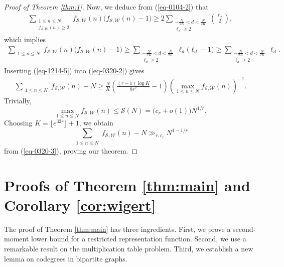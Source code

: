 \documentclass[12pt,a4paper,reqno]{amsart}
\numberwithin{equation}{section}
\theoremstyle{plain}
\theoremstyle{definition}
\begin{document}
\begin{proof}[Proof of Theorem \ref{thm:1}]
Now, we deduce from (\ref{eq-0104-2}) that
\begin{align*}
\sum_{\substack{1\leq n \leq N \\ f_{\mathscr{S}, \mathscr{W}}(n)\ge 2}}f_{\mathscr{S}, \mathscr{W}}(n)\big(f_{\mathscr{S}, \mathscr{W}}(n)-1\big)\ge 2\sum_{\substack{-\frac{N}{2K}<d<\frac{N}{2K}\\ \ell_d\ge 2}}\binom{\ell_d}{2},
\end{align*}
which implies
\begin{align}\label{eq-0320-2}
\sum_{\substack{1\leq n \leq N}}f_{\mathscr{S}, \mathscr{W}}(n)\big(f_{\mathscr{S}, \mathscr{W}}(n)-1\big)\ge \sum_{\substack{-\frac{N}{2K}<d<\frac{N}{2K}\\ \ell_d\ge 2}}\ell_d\big(\ell_d-1\big)\ge \sum_{\substack{-\frac{N}{2K}<d<\frac{N}{2K}\\ \ell_d\ge 2}}\ell_d.
\end{align}
Inserting (\ref{eq-1214-5}) into (\ref{eq-0320-2}) gives
\begin{align}\label{eq-0320-3}
\sum_{\substack{1\leq n \leq N}}f_{\mathscr{S}, \mathscr{W}}(n)-N\ge \frac{N}{K}\left(\frac{(r-1)\log K}{8r^2}-1\right) \left(\max_{1\le n\le N}f_{\mathscr{S}, \mathscr{W}}(n)\right)^{-1}.
\end{align}
Trivially, 
$$
\max_{1\le n\le N}f_{\mathscr{S}, \mathscr{W}}(n)\le \mathscr{S}(N)=\big(c_r+o(1)\big)N^{1/r}.
$$
Choosing $K=\lfloor e^{32r}\rfloor+1$, we obtain 
$$
\sum_{\substack{1\leq n \leq N}}f_{\mathscr{S}, \mathscr{W}}(n)-N\gg_{r, c_r} N^{1-1/r}
$$
from (\ref{eq-0320-3}), proving our theorem.
\end{proof}

\section{Proofs of Theorem \ref{thm:main} and Corollary \ref{cor:wigert}}
The proof of Theorem \ref{thm:main} has three ingredients. First, we prove a second-moment lower bound for a restricted representation function. Second, we use a remarkable result on the multiplication table problem. Third, we establish a new lemma on codegrees in bipartite graphs.
\end{document}
